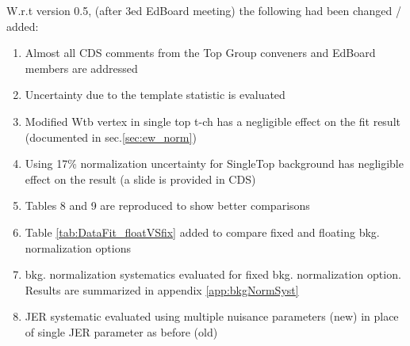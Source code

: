 W.r.t version 0.5, (after 3ed EdBoard meeting) the following had been changed / added:
\begin{enumerate}
\item Almost all CDS comments from the Top Group conveners and EdBoard members are addressed
\item Uncertainty due to the template statistic is evaluated
\item Modified Wtb vertex in single top t-ch has a negligible effect on the fit result (documented in sec.\ref{sec:ew_norm})
\item Using 17\% normalization uncertainty for SingleTop background has negligible effect on the result (a slide is provided in CDS)
\item Tables 8 and 9 are reproduced to show better comparisons
\item Table \ref{tab:DataFit_floatVSfix} added to compare fixed and floating bkg. normalization options
\item bkg. normalization systematics evaluated for fixed bkg. normalization option. Results are summarized in appendix \ref{app:bkgNormSyst}
\item JER systematic evaluated using multiple nuisance parameters (new) in place of single JER parameter as before (old)
\end{enumerate}




